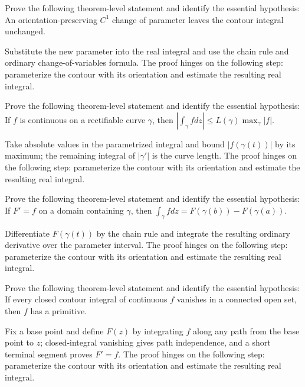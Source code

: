 \begin{problem}\label{prob:iv04-problem-08}
Prove the following theorem-level statement and identify the essential hypothesis: An orientation-preserving $C^1$ change of parameter leaves the contour integral unchanged.
\end{problem}
\begin{solution}
Substitute the new parameter into the real integral and use the chain rule and ordinary change-of-variables formula. The proof hinges on the following step: parameterize the contour with its orientation and estimate the resulting real integral.
\end{solution}

\begin{problem}[ML inequality]\label{prob:iv04-problem-09}
Prove the following theorem-level statement and identify the essential hypothesis: If $f$ is continuous on a rectifiable curve $\gamma$, then $|\int_\gamma fdz|\le L(\gamma)\max_\gamma|f|$.
\end{problem}
\begin{solution}
Take absolute values in the parametrized integral and bound $|f(\gamma(t))|$ by its maximum; the remaining integral of $|\gamma'|$ is the curve length. The proof hinges on the following step: parameterize the contour with its orientation and estimate the resulting real integral.
\end{solution}

\begin{problem}\label{prob:iv04-problem-10}
Prove the following theorem-level statement and identify the essential hypothesis: If $F'=f$ on a domain containing $\gamma$, then $\int_\gamma fdz=F(\gamma(b))-F(\gamma(a))$.
\end{problem}
\begin{solution}
Differentiate $F(\gamma(t))$ by the chain rule and integrate the resulting ordinary derivative over the parameter interval. The proof hinges on the following step: parameterize the contour with its orientation and estimate the resulting real integral.
\end{solution}

\begin{problem}\label{prob:iv04-problem-11}
Prove the following theorem-level statement and identify the essential hypothesis: If every closed contour integral of continuous $f$ vanishes in a connected open set, then $f$ has a primitive.
\end{problem}
\begin{solution}
Fix a base point and define $F(z)$ by integrating $f$ along any path from the base point to $z$; closed-integral vanishing gives path independence, and a short terminal segment proves $F'=f$. The proof hinges on the following step: parameterize the contour with its orientation and estimate the resulting real integral.
\end{solution}

